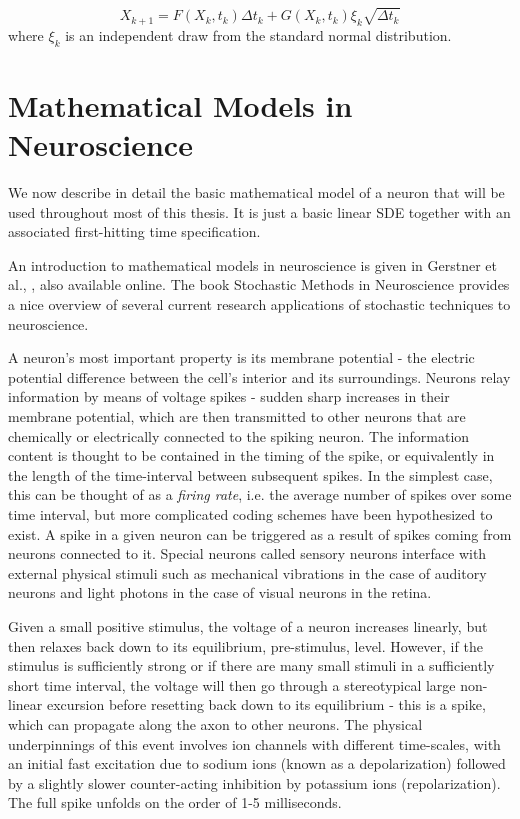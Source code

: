 \begin{equation}
X_{k+1} = F(X_k,t_k)  \Delta t_k   + G(X_k,t_k) \xi_k \sqrt{\Delta t_k }
\label{eq:euler_maruyama_discretization_generic_Ito_SDE}
\end{equation}
where $\xi_k$ is an independent draw from the standard normal distribution. 


\section{Mathematical Models in Neuroscience}
\label{sec:math_models_in_neuroscience}
We now describe in detail the basic mathematical model of a neuron that will be
used throughout most of this thesis. It is just a basic linear SDE together with an associated
first-hitting time specification.

An introduction to mathematical models in neuroscience is given in Gerstner et
al., \cite{Gerstner2014}, also available online. The book Stochastic Methods in
Neuroscience \cite{Laing2009} provides a nice overview of several current research
applications of stochastic techniques to neuroscience.

A neuron's most important property is its membrane potential - the electric
potential difference between the cell's interior and its surroundings. Neurons
relay information by means of voltage spikes - sudden sharp increases in their
membrane potential, which are then transmitted to other neurons that are
chemically or electrically connected to the spiking neuron. The information
content is thought to be contained in the timing of the spike, or equivalently
in the length of the time-interval between subsequent spikes. In the simplest
case, this can be thought of as a {\sl firing rate}, i.e. the average number of
spikes over some time interval, but more complicated coding schemes have been hypothesized
to exist. A spike in a given neuron can be triggered as a result of spikes coming from neurons 
connected to it. Special neurons called sensory neurons interface with external physical stimuli
 such as mechanical vibrations in the case of auditory neurons and light photons in the case of visual neurons in the retina.  

Given a small positive stimulus, the voltage of a neuron increases linearly, but
then relaxes back down to its equilibrium, pre-stimulus, level. However, if the
stimulus is sufficiently strong or if there are many small stimuli in a
sufficiently short time interval, the voltage will then go through a stereotypical large
 non-linear excursion before resetting back down to its equilibrium
 - this is a spike, which can propagate along the axon to other neurons. 
 The physical underpinnings of this event involves ion
 channels with different time-scales, with an initial fast excitation due to sodium ions (known as a depolarization) 
 followed by a slightly slower counter-acting inhibition by potassium ions (repolarization). 
 The full spike unfolds on the order of 1-5 milliseconds. 
 
